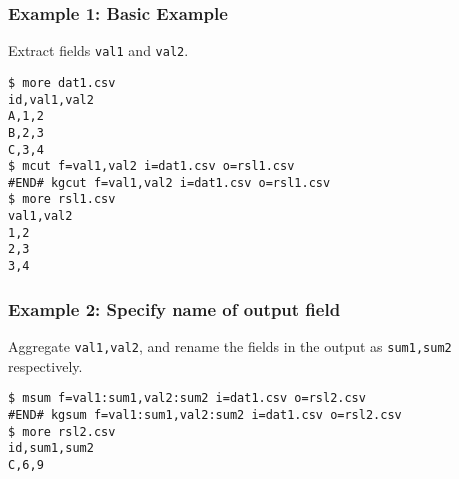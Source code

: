 \subsubsection*{Example 1: Basic Example}

Extract fields \verb|val1| and \verb|val2|.


\begin{Verbatim}[baselinestretch=0.7,frame=single]
$ more dat1.csv
id,val1,val2
A,1,2
B,2,3
C,3,4
$ mcut f=val1,val2 i=dat1.csv o=rsl1.csv
#END# kgcut f=val1,val2 i=dat1.csv o=rsl1.csv
$ more rsl1.csv
val1,val2
1,2
2,3
3,4
\end{Verbatim}
\subsubsection*{Example 2: Specify name of output field}

Aggregate \verb|val1,val2|, and rename the fields in the output as \verb|sum1,sum2| respectively.


\begin{Verbatim}[baselinestretch=0.7,frame=single]
$ msum f=val1:sum1,val2:sum2 i=dat1.csv o=rsl2.csv
#END# kgsum f=val1:sum1,val2:sum2 i=dat1.csv o=rsl2.csv
$ more rsl2.csv
id,sum1,sum2
C,6,9
\end{Verbatim}
